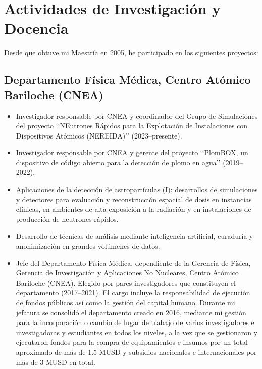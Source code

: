 \section*{Actividades de Investigación y Docencia}

Desde que obtuve mi Maestría en 2005, he participado en los siguientes proyectos:

\subsection*{Departamento Física Médica, Centro Atómico Bariloche (CNEA)}
\begin{itemize}
	\item Investigador responsable por CNEA y coordinador del Grupo de Simulaciones del proyecto \lq\lq{}NEutrones Rápidos para la Explotación de Instalaciones con Dispositivos Atómicos (NEREIDA)\rq\rq{} (2023--presente).
	\item Investigador responsable por CNEA y gerente del proyecto \lq\lq{}PlomBOX, un dispositivo de código abierto para la detección de plomo en agua\rq\rq{} (2019--2022).
	\item Aplicaciones de la detección de astropartículas (I): desarrollos de simulaciones y detectores para evaluación y reconstrucción espacial de dosis en instancias clínicas, en ambientes de alta exposición a la radiación y en instalaciones de producción de neutrones rápidos.
	\item Desarrollo de técnicas de análisis mediante inteligencia artificial, curaduría y anonimización en grandes volúmenes de datos.
 	\item Jefe del Departamento Física Médica, dependiente de la Gerencia de Física, Gerencia de Investigación y Aplicaciones No Nucleares, Centro Atómico Bariloche (CNEA).
 	Elegido por pares investigadores que constituyen el departamento (2017--2021).
 	El cargo incluye la responsabilidad de ejecución de fondos públicos así como la gestión del capital humano.
 	Durante mi jefatura se consolidó el departamento creado en 2016, mediante mi gestión para la incorporación o cambio de lugar de trabajo de varios investigadores e investigadoras y estudiantes en todos los niveles, a la vez que se gestionaron y ejecutaron fondos para la compra de equipamientos e insumos por un total aproximado de más de 1.5 MUSD y subsidios nacionales e internacionales por más de 3 MUSD en total.
\end{itemize}

